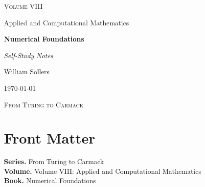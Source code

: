 \documentclass[12pt, a4paper]{report}
\begin{document}
\ExplSyntaxOff
\renewcommand{\familydefault}{\rmdefault}

\begin{titlepage}
\centering
\vspace*{3.5cm}

{\Large\scshape Volume VIII\par}
\vspace{0.35cm}
{\large Applied and Computational Mathematics\par}

\vspace{1.4cm}

{\Huge\bfseries Numerical Foundations\par}

\vspace{0.6cm}
{\large\itshape Self-Study Notes\par}

\vfill

{\large William Sollers\par}
\vspace{0.35cm}
{\large \today\par}

\vfill

{\large\scshape From Turing to Carmack\par}
\end{titlepage}

\clearpage
\thispagestyle{plain}
\chapter*{Front Matter}
\noindent\textbf{Series.} From Turing to Carmack\\[0.5em]
\textbf{Volume.} Volume VIII: Applied and Computational Mathematics\\[0.5em]
\textbf{Book.} Numerical Foundations

\clearpage
\tableofcontents
\clearpage
{}



\clearpage



\printindex[tech]
\printindex[dep]
\end{document}

